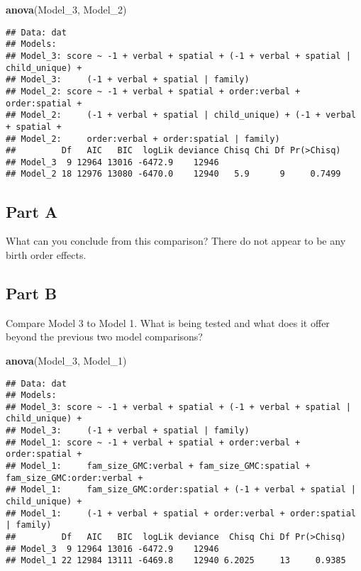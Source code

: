 \documentclass[]{article}
\newenvironment{Shaded}{\begin{snugshade}}{\end{snugshade}}
\newcommand{\KeywordTok}[1]{\textcolor[rgb]{0.13,0.29,0.53}{\textbf{#1}}}
\newcommand{\DecValTok}[1]{\textcolor[rgb]{0.00,0.00,0.81}{#1}}
\newcommand{\NormalTok}[1]{#1}
\begin{document}
\begin{Shaded}
\begin{Highlighting}[]
\KeywordTok{anova}\NormalTok{(Model_}\DecValTok{3}\NormalTok{, Model_}\DecValTok{2}\NormalTok{)}
\end{Highlighting}
\end{Shaded}

\begin{verbatim}
## Data: dat
## Models:
## Model_3: score ~ -1 + verbal + spatial + (-1 + verbal + spatial | child_unique) + 
## Model_3:     (-1 + verbal + spatial | family)
## Model_2: score ~ -1 + verbal + spatial + order:verbal + order:spatial + 
## Model_2:     (-1 + verbal + spatial | child_unique) + (-1 + verbal + spatial + 
## Model_2:     order:verbal + order:spatial | family)
##         Df   AIC   BIC  logLik deviance Chisq Chi Df Pr(>Chisq)
## Model_3  9 12964 13016 -6472.9    12946                        
## Model_2 18 12976 13080 -6470.0    12940   5.9      9     0.7499
\end{verbatim}

\subsection{Part A}\label{part-a}

What can you conclude from this comparison? There do not appear to be
any birth order effects.

\subsection{Part B}\label{part-b}

Compare Model 3 to Model 1. What is being tested and what does it offer
beyond the previous two model comparisons?

\begin{Shaded}
\begin{Highlighting}[]
\KeywordTok{anova}\NormalTok{(Model_}\DecValTok{3}\NormalTok{, Model_}\DecValTok{1}\NormalTok{)}
\end{Highlighting}
\end{Shaded}

\begin{verbatim}
## Data: dat
## Models:
## Model_3: score ~ -1 + verbal + spatial + (-1 + verbal + spatial | child_unique) + 
## Model_3:     (-1 + verbal + spatial | family)
## Model_1: score ~ -1 + verbal + spatial + order:verbal + order:spatial + 
## Model_1:     fam_size_GMC:verbal + fam_size_GMC:spatial + fam_size_GMC:order:verbal + 
## Model_1:     fam_size_GMC:order:spatial + (-1 + verbal + spatial | child_unique) + 
## Model_1:     (-1 + verbal + spatial + order:verbal + order:spatial | family)
##         Df   AIC   BIC  logLik deviance  Chisq Chi Df Pr(>Chisq)
## Model_3  9 12964 13016 -6472.9    12946                         
## Model_1 22 12984 13111 -6469.8    12940 6.2025     13     0.9385
\end{verbatim}
\end{document}
